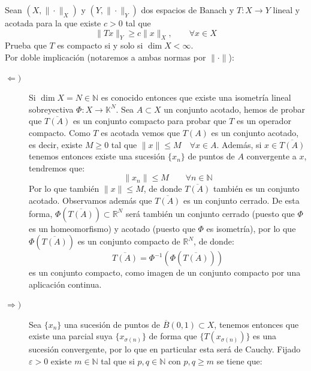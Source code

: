 \documentclass[12pt]{article}
\begin{document}
    \begin{ejercicio}
        Sean $(X,\|\cdot \|_X)$ y $(Y,\|\cdot \|_Y)$ dos espacios de Banach y $T:X\to Y$ lineal y acotada para la que existe $c>0$ tal que
        \begin{equation*}
            \|Tx\|_Y \geq c\|x\|_X,\qquad \forall x\in X
        \end{equation*}
        Prueba que $T$ es compacto si y solo si $\dim X < \infty$.\\

        \noindent
        Por doble implicación (notaremos a ambas normas por $\|\cdot \|$):
        \begin{description}
            \item [$\Longleftarrow )$] Si $\dim X = N\in \mathbb{N}$ es conocido entonces que existe una isometría lineal sobreyectiva $\Phi:X\to \mathbb{K}^N$. Sea $A\subset X$ un conjunto acotado, hemos de probar que $\overline{T(A)}$ es un conjunto compacto para probar que $T$ es un operador compacto. Como $T$ es acotada vemos que $T(A)$ es un conjunto acotado, es decir, existe $M\geq 0$ tal que $\|x\|\leq M \quad \forall x\in A$. Además, si $x\in \overline{T(A)}$ tenemos entonces existe una sucesión $\{x_n\}$ de puntos de $A$ convergente a $x$, tendremos que:
                \begin{equation*}
                    \|x_n\| \leq M \qquad \forall n\in \mathbb{N}
                \end{equation*}
                Por lo que también $\|x\|\leq M$, de donde $\overline{T(A)}$ también es un conjunto acotado. Observamos además que $\overline{T(A)}$ es un conjunto cerrado. De esta forma, $\Phi(\overline{T(A)})\subset \mathbb{R}^N$ será también un conjunto cerrado (puesto que $\Phi$ es un homeomorfismo) y acotado (puesto que $\Phi$ es isometría), por lo que $\Phi(\overline{T(A)})$ es un conjunto compacto de $\mathbb{R}^N$, de donde:
                \begin{equation*}
                    \overline{T(A)} = \Phi^{-1}\left(\Phi(\overline{T(A)})\right)
                \end{equation*}
                es un conjunto compacto, como imagen de un conjunto compacto por una aplicación continua.
            \item [$\Longrightarrow )$] Sea $\{x_n\}$ una sucesión de puntos de $\overline{B}(0,1)\subset X$, tenemos entonces que existe una parcial suya $\{x_{\sigma(n)}\}$ de forma que $\{T(x_{\sigma(n)})\}$ es una sucesión convergente, por lo que en particular esta será de Cauchy. Fijado $\varepsilon>0$ existe $m\in \mathbb{N}$ tal que si $p,q\in \mathbb{N}$ con $p,q\geq m$ se tiene que:

\end{description}
\end{ejercicio}
\end{document}
